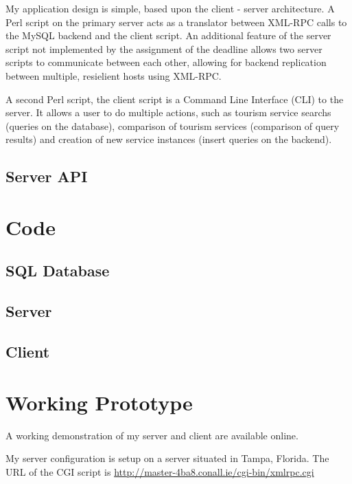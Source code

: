 \documentclass[a4paper,10pt]{article}
\begin{document}
My application design is simple, based upon the client - server
architecture. A Perl script on the primary server acts as a translator
between XML-RPC calls to the MySQL backend and the client script. An 
additional feature of the server script not implemented by the 
assignment of the deadline allows two server scripts to communicate
between each other, allowing for backend replication between multiple,
resielient hosts using XML-RPC.


A second Perl script, the client script is a Command Line Interface 
(CLI) to the server. It allows a user to do multiple actions, such as
tourism service searchs (queries on the database), comparison of tourism 
services (comparison of query results) and creation of new service
instances (insert queries on the backend).

\subsection{Server API}



\section{Code}

\subsection{SQL Database}


%

\subsection{Server}

\subsection{Client}

\section{Working Prototype}

A working demonstration of my server and client are available online.


My server configuration is setup on a server situated in Tampa, Florida.
The URL of the CGI script is
\url{http://master-4ba8.conall.ie/cgi-bin/xmlrpc.cgi}
\end{document}
